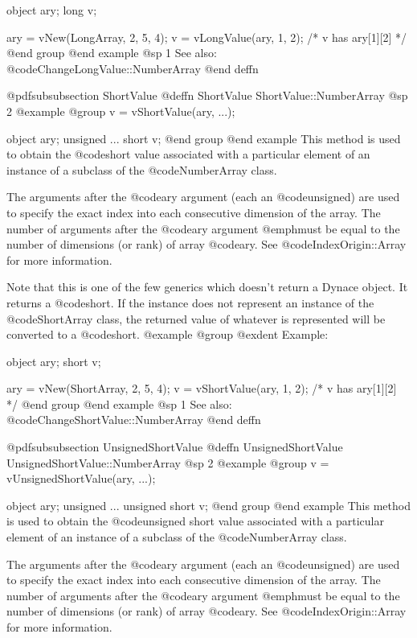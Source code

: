 object  ary;
long    v;

ary = vNew(LongArray, 2, 5, 4);
v = vLongValue(ary, 1, 2);
/*  v has ary[1][2]  */
@end group
@end example
@sp 1
See also:  @code{ChangeLongValue::NumberArray}
@end deffn









@pdfsubsubsection {ShortValue}
@deffn {ShortValue} ShortValue::NumberArray
@sp 2
@example
@group
v = vShortValue(ary, ...);

object    ary;
unsigned  ...
short     v;
@end group
@end example
This method is used to obtain the @code{short} value associated with a
particular element of an instance of a subclass of the
@code{NumberArray} class.

The arguments after the @code{ary} argument (each an @code{unsigned})
are used to specify the exact index into each consecutive dimension of
the array.  The number of arguments after the @code{ary} argument
@emph{must} be equal to the number of dimensions (or rank) of array
@code{ary}.  See @code{IndexOrigin::Array} for more information.

Note that this is one of the few generics which doesn't return a Dynace
object.  It returns a @code{short}.  If the instance does not represent
an instance of the @code{ShortArray} class, the returned value of
whatever is represented will be converted to a @code{short}.
@example
@group
@exdent Example:

object  ary;
short   v;

ary = vNew(ShortArray, 2, 5, 4);
v = vShortValue(ary, 1, 2);
/*  v has ary[1][2]  */
@end group
@end example
@sp 1
See also:  @code{ChangeShortValue::NumberArray}
@end deffn






@pdfsubsubsection {UnsignedShortValue}
@deffn {UnsignedShortValue} UnsignedShortValue::NumberArray
@sp 2
@example
@group
v = vUnsignedShortValue(ary, ...);

object    ary;
unsigned  ...
unsigned short     v;
@end group
@end example
This method is used to obtain the @code{unsigned short} value associated with a
particular element of an instance of a subclass of the
@code{NumberArray} class.

The arguments after the @code{ary} argument (each an @code{unsigned})
are used to specify the exact index into each consecutive dimension of
the array.  The number of arguments after the @code{ary} argument
@emph{must} be equal to the number of dimensions (or rank) of array
@code{ary}.  See @code{IndexOrigin::Array} for more information.

